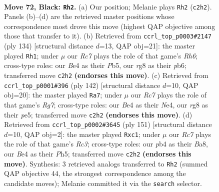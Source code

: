 \documentclass[11pt]{article}
\begin{document}
\clearpage

\begin{figure}[p]\centering
\begin{subfigure}{0.46\textwidth}\centering
\resizebox{\linewidth}{!}{%
\newchessgame
\chessboard[
  setfen={6R1/8/3k4/8/1P2b3/8/2r5/3K1R2 b - - 18 72},
  showmover=false,
  pgfstyle=straightmove, color=movearrow, markmove={c2-h2}
]}
\caption{}
\end{subfigure}\hfill
\begin{subfigure}{0.46\textwidth}\centering
\resizebox{\linewidth}{!}{%
\newchessgame
\chessboard[
  setfen={8/6r1/1p5R/1P4k1/8/5K2/8/8 w - - 18 68},
  showmover=false,
  pgfstyle=straightmove, color=movearrow, markmove={h6-h1}
]}
\caption{}
\end{subfigure}
\\[4pt]
\begin{subfigure}{0.46\textwidth}\centering
\resizebox{\linewidth}{!}{%
\newchessgame
\chessboard[
  setfen={5k2/6R1/7K/4p3/4N3/8/8/5r2 w - - 1 72},
  showmover=false,
  pgfstyle=straightmove, color=movearrow, markmove={g7-a7}
]}
\caption{}
\end{subfigure}\hfill
\begin{subfigure}{0.46\textwidth}\centering
\resizebox{\linewidth}{!}{%
\newchessgame
\chessboard[
  setfen={b6k/3R1K2/2r5/7p/7P/8/8/2B5 b - - 2 76},
  showmover=false,
  pgfstyle=straightmove, color=movearrow, markmove={c6-c1}
]}
\caption{}
\end{subfigure}
\caption{\textbf{Move 72, Black: \texttt{Rh2}.} (a) Our position; Melanie plays \texttt{Rh2} (\texttt{c2h2}). Panels (b)--(d) are the retrieved master positions whose correspondence most drove this move (highest QAP objective among those that transfer to it). (b) Retrieved from \texttt{ccrl\_top\_p0003\#2147} (ply 134) [structural distance $d$=13, QAP obj=21]: the master played \texttt{Rh1}; under $\mu$ our \emph{Rc7} plays the role of that game's \emph{Rh6}; cross-type roles: our \emph{B}e4 as their \emph{P}b5, our \emph{r}g8 as their \emph{p}b6; transferred move \texttt{c2h2} \textbf{(endorses this move)}. (c) Retrieved from \texttt{ccrl\_top\_p0001\#396} (ply 142) [structural distance $d$=10, QAP obj=20]: the master played \texttt{Ra7}; under $\mu$ our \emph{Rc7} plays the role of that game's \emph{Rg7}; cross-type roles: our \emph{B}e4 as their \emph{N}e4, our \emph{r}g8 as their \emph{p}e5; transferred move \texttt{c2h2} \textbf{(endorses this move)}. (d) Retrieved from \texttt{ccrl\_top\_p0002\#3645} (ply 151) [structural distance $d$=10, QAP obj=2]: the master played \texttt{Rxc1}; under $\mu$ our \emph{Rc7} plays the role of that game's \emph{Rc3}; cross-type roles: our \emph{p}b4 as their \emph{B}a8, our \emph{B}e4 as their \emph{P}h5; transferred move \texttt{c2h2} \textbf{(endorses this move)}. Synthesis: 3 retrieved analogs transferred to \texttt{Rh2} (summed QAP objective 44, the strongest correspondence among the candidate moves); Melanie committed it via the \texttt{search} selector.}
\label{fig:thought-m143}
\end{figure}
\end{document}
